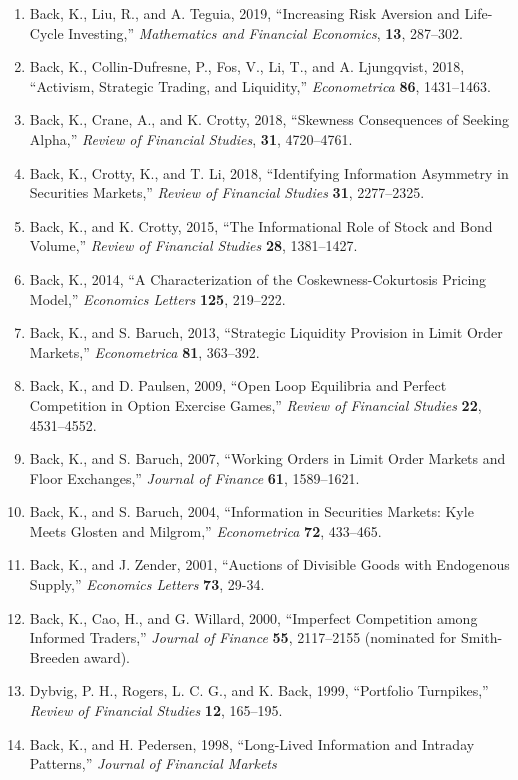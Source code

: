 \documentclass[margin, 11pt]{res}
\begin{document}
\begin{resume}
\begin{enumerate}
\item Back, K., Liu, R., and A. Teguia, 2019, ``Increasing Risk Aversion and Life-Cycle Investing,'' \textit{Mathematics and Financial Economics}, \textbf{13}, 287--302.
\item Back, K., Collin-Dufresne, P., Fos, V., Li, T., and A. Ljungqvist, 2018, ``Activism, Strategic Trading, and Liquidity,'' \textit{Econometrica} \textbf{86}, 1431--1463.
\item Back, K., Crane, A., and K. Crotty, 2018, ``Skewness Consequences of Seeking Alpha,'' \textit{Review of Financial Studies}, \textbf{31}, 4720--4761.
\item Back, K., Crotty, K., and T. Li, 2018, ``Identifying Information Asymmetry in Securities Markets,'' \textit{Review of Financial Studies} \textbf{31}, 2277--2325.
\item Back, K., and K. Crotty, 2015, ``The Informational Role of Stock and Bond Volume,'' \textit{Review of Financial Studies} \textbf{28}, 1381--1427.
\item Back, K., 2014, ``A Characterization of the Coskewness-Cokurtosis Pricing Model,'' \textit{Economics Letters} \textbf{125}, 219--222.  
\item Back, K., and S. Baruch, 2013, ``Strategic Liquidity Provision in Limit Order Markets,'' \textit{Econometrica} \textbf{81}, 363--392.
\item Back, K., and D. Paulsen, 2009, ``Open Loop Equilibria and Perfect Competition in Option Exercise Games,'' \textit{Review of Financial Studies} \textbf{22}, 4531--4552.
\item Back, K., and S. Baruch, 2007, ``Working Orders in Limit Order Markets and Floor Exchanges,'' \textit{Journal of Finance} \textbf{61}, 1589--1621.
\item Back, K., and S. Baruch, 2004, ``Information in Securities Markets: Kyle Meets Glosten and Milgrom,'' \textit{Econometrica} \textbf{72}, 433--465.
\item Back, K., and J. Zender, 2001, ``Auctions of Divisible Goods with Endogenous Supply,'' {\em Economics Letters\/} {\bf 73}, 29-34.
\item Back, K., Cao, H., and G. Willard, 2000, ``Imperfect Competition
among Informed Traders,'' {\em Journal of Finance\/} {\bf 55}, 2117--2155 (nominated for Smith-Breeden award).
\item Dybvig, P. H., Rogers, L. C. G., and K. Back, 1999,
``Portfolio Turnpikes,'' {\em Review of Financial Studies\/} {\bf 12}, 165--195.
\item Back, K., and H. Pedersen, 1998, ``Long-Lived Information and Intraday Patterns,'' {\em Journal of Financial Markets\/}

\end{enumerate}
\end{resume}
\end{document}
